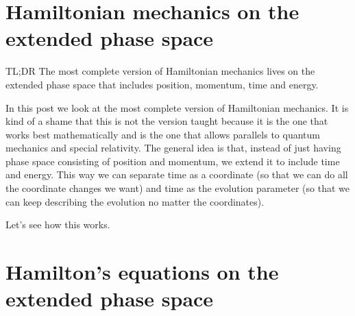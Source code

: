 \documentclass[aps,pra,10pt,floatfix,nofootinbib]{revtex4-1}
\theoremstyle{definition}
\begin{document}
\section{Hamiltonian mechanics on the extended phase space}

TL;DR The most complete version of Hamiltonian mechanics lives on the extended phase space that includes position, momentum, time and energy.

In this post we look at the most complete version of Hamiltonian mechanics. It is kind of a shame that this is not the version taught because it is the one that works best mathematically and is the one that allows parallels to quantum mechanics and special relativity. The general idea is that, instead of just having phase space consisting of position and momentum, we extend it to include time and energy. This way we can separate time as a coordinate (so that we can do all the coordinate changes we want) and time as the evolution parameter (so that we can keep describing the evolution no matter the coordinates).

Let's see how this works.

\section{Hamilton's equations on the extended phase space}
\end{document}
